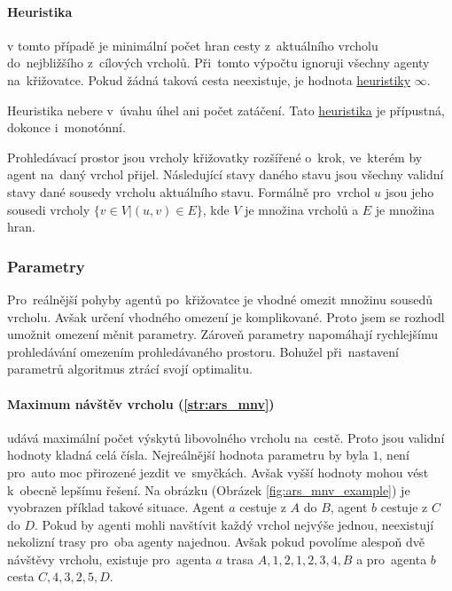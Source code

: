 \paragraph{Heuristika}\label{par:ars_heuristika} v tomto případě je minimální počet hran cesty
z~aktuálního vrcholu do~nejbližšího z~cílových vrcholů.
Při~tomto výpočtu ignoruji všechny agenty na~křižovatce.
Pokud žádná taková cesta neexistuje, je hodnota \hyperref[par:ars_heuristika]{heuristiky} $\infty$.

Heuristika nebere v~úvahu úhel ani počet zatáčení.
Tato \hyperref[par:ars_heuristika]{heuristika} je přípustná, dokonce i~monotónní.

Prohledávací prostor jsou vrcholy křižovatky rozšířené o~krok, ve~kterém by agent na~daný vrchol přijel.
Následující stavy daného stavu jsou všechny validní stavy dané sousedy vrcholu aktuálního stavu.
Formálně pro~vrchol $u$ jsou jeho sousedi vrcholy $\{v \in V | (u,v)\in E\}$,
kde $V$ je množina vrcholů a $E$ je množina hran.

\subsubsection{Parametry}\label{subsubsec:ars_parametry}
Pro~reálnější pohyby agentů po~křižovatce je vhodné omezit množinu sousedů vrcholu.
Avšak určení vhodného omezení je komplikované.
Proto jsem se rozhodl umožnit omezení měnit parametry.
Zároveň parametry napomáhají rychlejšímu prohledávání omezením prohledávaného prostoru.
Bohužel při~nastavení parametrů algoritmus ztrácí svojí optimalitu.

\paragraph{Maximum návštěv vrcholu (\ref{str:ars_mnv})}
udává maximální počet výskytů libovolného vrcholu na~cestě.
Proto jsou validní hodnoty kladná celá čísla.
Nejreálnější hodnota parametru by byla $1$, není pro~auto moc přirozené jezdit ve~smyčkách.
Avšak vyšší hodnoty mohou vést k~obecně lepšímu řešení.
Na obrázku (Obrázek \ref{fig:ars_mnv_example}) je vyobrazen příklad takové situace.
Agent $a$ cestuje z $A$ do $B$, agent $b$ cestuje z $C$ do $D$.
Pokud by agenti mohli navštívit každý vrchol nejvýše jednou, neexistují nekolizní trasy pro~oba agenty najednou.
Avšak pokud povolíme alespoň dvě návštěvy vrcholu, existuje pro~agenta $a$ trasa $A, 1, 2, 1, 2, 3, 4, B$
a pro~agenta $b$ cesta $C, 4, 3, 2, 5, D$.

